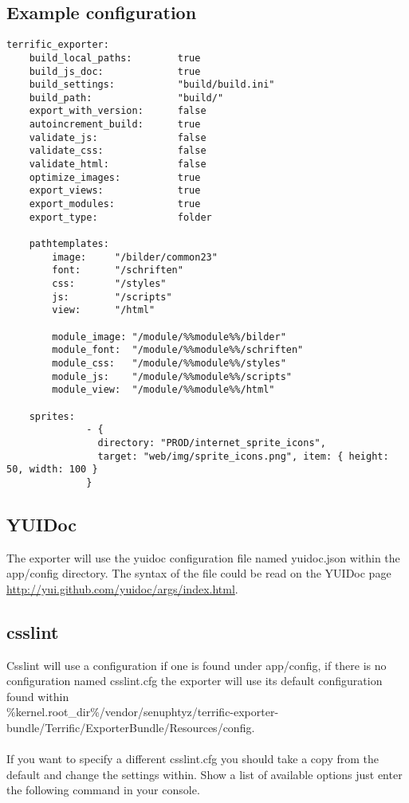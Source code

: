 \subsection{Example configuration}

\begin{verbatim}
terrific_exporter:
	build_local_paths:        true
	build_js_doc:             true
	build_settings:           "build/build.ini"
	build_path:               "build/"
	export_with_version:      false
	autoincrement_build:      true
	validate_js:              false
	validate_css:             false
	validate_html:            false
	optimize_images:          true
	export_views:             true
	export_modules:           true
	export_type:              folder

	pathtemplates:
        image:     "/bilder/common23"
        font:      "/schriften"
        css:       "/styles"
        js:        "/scripts"
        view:      "/html"

        module_image: "/module/%%module%%/bilder"
        module_font:  "/module/%%module%%/schriften"
        module_css:   "/module/%%module%%/styles"
        module_js:    "/module/%%module%%/scripts"
        module_view:  "/module/%%module%%/html"

	sprites:
              - {
                directory: "PROD/internet_sprite_icons",
                target: "web/img/sprite_icons.png", item: { height: 50, width: 100 }
              }

\end{verbatim}

\subsection{YUIDoc}
The exporter will use the yuidoc configuration file named yuidoc.json within the app/config directory. The syntax of the file could be read on the YUIDoc page \url{http://yui.github.com/yuidoc/args/index.html}.

\subsection{csslint}
Csslint will use a configuration if one is found under app/config, if there is no configuration named csslint.cfg the exporter will use its default configuration found within\\
\%kernel.root\_dir\%/vendor/senuphtyz/terrific-exporter-bundle/Terrific/ExporterBundle/Resources/config. \\
\\
If you want to specify a different csslint.cfg you should take a copy from the default and change the settings within. Show a list of available options just enter the following command in your console.

